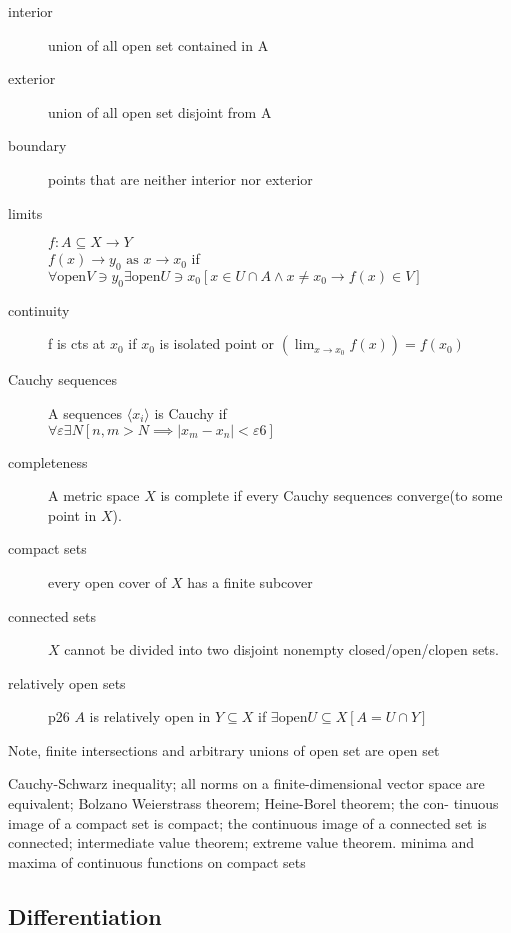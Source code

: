 \begin{description}
\item[interior]
	union of all open set contained in A
\item[exterior]
	union of all open set disjoint from A
\item[boundary]
	points that are neither interior nor exterior
\item[limits] $f:A\subseteq X\to Y$\hfill\\
$f(x)\to y_0 \textrm{ as } x\to x_0$ if
$\forall \mathrm{open} V\ni y_0\exists \mathrm{open} U\ni x_0 
	[x\in U\cap A \wedge x\neq x_0 \to f(x)\in V]$
\item[continuity] f is cts at $x_0$ if $x_0$ is isolated point or $(\lim_{x\to x_0}f(x)) = f(x_0)$
\item[Cauchy sequences] A sequences $\langle x_i\rangle$ is Cauchy if\hfill\\
	$\forall \varepsilon \exists N [n,m>N\implies |x_m-x_n|<\varepsilon6]$
\item[completeness]
	A metric space $X$ is complete if every Cauchy sequences converge(to some point in $X$).
\item[compact sets]
	every open cover of $X$ has a finite subcover
\item[connected sets]
	$X$ cannot be divided into two disjoint nonempty closed/open/clopen sets.
\item[relatively open sets] p26
	$A$ is relatively open in $Y\subseteq X$ if $\exists \mathrm{open}U\subseteq X [A=U\cap Y]$
\end{description}

Note, finite intersections and arbitrary unions of open set are open set

Cauchy-Schwarz inequality; all norms on a finite-dimensional vector
space are equivalent; Bolzano Weierstrass theorem; Heine-Borel theorem; the con-
tinuous image of a compact set is compact; the continuous image of a connected
set is connected; intermediate value theorem; extreme value theorem. minima and
maxima of continuous functions on compact sets
\subsection{Differentiation}


